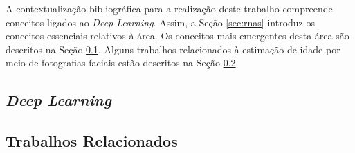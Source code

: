 
A contextualização bibliográfica para a realização deste trabalho compreende conceitos ligados ao \emph{
Deep Learning}. Assim, a Seção \ref{sec:rnas} introduz os conceitos essenciais relativos à área. Os conceitos mais emergentes desta área são descritos na Seção \ref{sec:dl}. Alguns trabalhos relacionados à estimação de idade por meio de fotografias faciais estão descritos na Seção \ref{sec:trab_relac}.

% 
%
% 

\subsection{\emph{Deep Learning}}\label{sec:dl}


\subsection{Trabalhos Relacionados}\label{sec:trab_relac}

